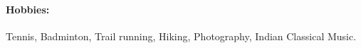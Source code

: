 \documentclass[10pt,fleqn]{article}
\begin{document}
\paragraph*{Hobbies:} Tennis, Badminton, Trail running, Hiking, Photography, Indian Classical Music.
\vspace{-10pt}
\end{document}
